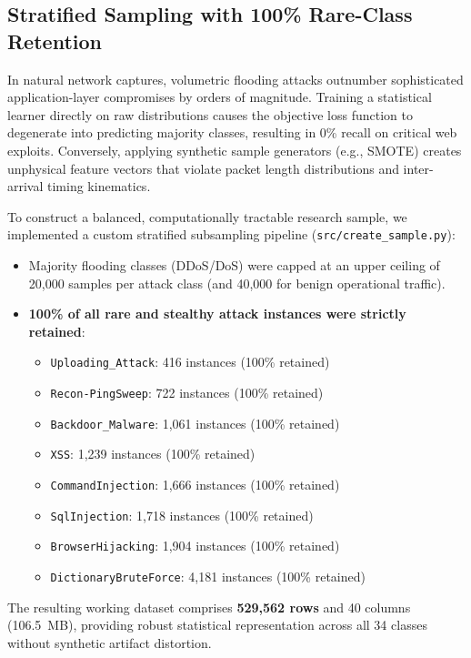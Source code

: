 \documentclass[12pt,a4paper]{report}
\begin{document}
\subsection{Stratified Sampling with 100\% Rare-Class Retention}
In natural network captures, volumetric flooding attacks outnumber sophisticated application-layer compromises by orders of magnitude. Training a statistical learner directly on raw distributions causes the objective loss function to degenerate into predicting majority classes, resulting in 0\% recall on critical web exploits. Conversely, applying synthetic sample generators (e.g., SMOTE) creates unphysical feature vectors that violate packet length distributions and inter-arrival timing kinematics.

To construct a balanced, computationally tractable research sample, we implemented a custom stratified subsampling pipeline (\texttt{src/create\_sample.py}):
\begin{itemize}
    \item Majority flooding classes (DDoS/DoS) were capped at an upper ceiling of 20,000 samples per attack class (and 40,000 for benign operational traffic).
    \item \textbf{100\% of all rare and stealthy attack instances were strictly retained}:
    \begin{itemize}
        \item \texttt{Uploading\_Attack}: 416 instances (100\% retained)
        \item \texttt{Recon-PingSweep}: 722 instances (100\% retained)
        \item \texttt{Backdoor\_Malware}: 1,061 instances (100\% retained)
        \item \texttt{XSS}: 1,239 instances (100\% retained)
        \item \texttt{CommandInjection}: 1,666 instances (100\% retained)
        \item \texttt{SqlInjection}: 1,718 instances (100\% retained)
        \item \texttt{BrowserHijacking}: 1,904 instances (100\% retained)
        \item \texttt{DictionaryBruteForce}: 4,181 instances (100\% retained)
    \end{itemize}
\end{itemize}
The resulting working dataset comprises \textbf{529,562 rows} and 40 columns (106.5~MB), providing robust statistical representation across all 34 classes without synthetic artifact distortion.
\end{document}
